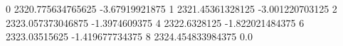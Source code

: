 0 2320.775634765625 -3.67919921875
1 2321.45361328125 -3.001220703125
2 2323.057373046875 -1.3974609375
4 2322.6328125 -1.822021484375
6 2323.03515625 -1.419677734375
8 2324.454833984375 0.0
